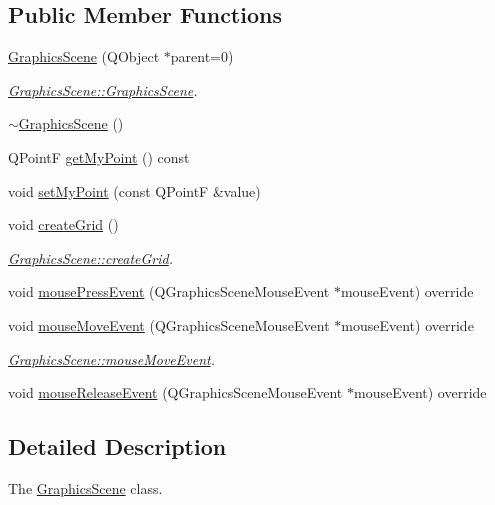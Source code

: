 \subsection*{Public Member Functions}
\begin{DoxyCompactItemize}
\item 
\hyperlink{class_graphics_scene_a8e12dad680e5944c7ecce5b399595742}{Graphics\+Scene} (Q\+Object $\ast$parent=0)
\begin{DoxyCompactList}\small\item\em \hyperlink{class_graphics_scene_a8e12dad680e5944c7ecce5b399595742}{Graphics\+Scene\+::\+Graphics\+Scene}. \end{DoxyCompactList}\item 
\hyperlink{class_graphics_scene_a49bf5569f93aa92ecf99c89c14a0b17d}{$\sim$\+Graphics\+Scene} ()
\item 
Q\+PointF \hyperlink{class_graphics_scene_aa341f24da86296d2f06fe485857b54b5}{get\+My\+Point} () const
\item 
void \hyperlink{class_graphics_scene_a2853f7e6ab37aeaa25c1dfc2d33eb7af}{set\+My\+Point} (const Q\+PointF \&value)
\item 
void \hyperlink{class_graphics_scene_aa6c883ed523812e7aec5018888b72ee1}{create\+Grid} ()
\begin{DoxyCompactList}\small\item\em \hyperlink{class_graphics_scene_aa6c883ed523812e7aec5018888b72ee1}{Graphics\+Scene\+::create\+Grid}. \end{DoxyCompactList}\item 
void \hyperlink{class_graphics_scene_ae2cdfb607a8ce680f0ed8c93c519ff01}{mouse\+Press\+Event} (Q\+Graphics\+Scene\+Mouse\+Event $\ast$mouse\+Event) override
\item 
void \hyperlink{class_graphics_scene_a1bc5a1a813d1ff00bba4e919ed1b7525}{mouse\+Move\+Event} (Q\+Graphics\+Scene\+Mouse\+Event $\ast$mouse\+Event) override
\begin{DoxyCompactList}\small\item\em \hyperlink{class_graphics_scene_a1bc5a1a813d1ff00bba4e919ed1b7525}{Graphics\+Scene\+::mouse\+Move\+Event}. \end{DoxyCompactList}\item 
void \hyperlink{class_graphics_scene_a5f83aea5c35bad170a3c766ab41bacf5}{mouse\+Release\+Event} (Q\+Graphics\+Scene\+Mouse\+Event $\ast$mouse\+Event) override
\end{DoxyCompactItemize}


\subsection{Detailed Description}
The \hyperlink{class_graphics_scene}{Graphics\+Scene} class. 

